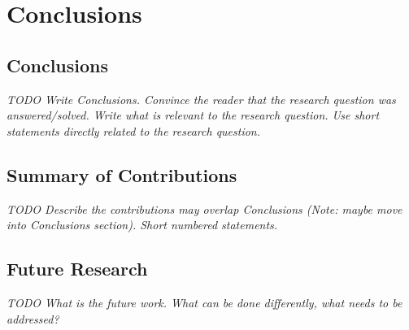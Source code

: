 
\chapter{Conclusions} %
\label{Chapter6}


\section{Conclusions}
\textit{TODO Write Conclusions. Convince the reader that the research question was answered/solved. Write what is relevant to the research question. Use short statements directly related to the research question. }

\lipsum[1-2]

\section{Summary of Contributions}
\textit{TODO Describe the contributions may overlap Conclusions (Note: maybe move into Conclusions section). Short numbered statements.}

\lipsum[1]


\section{Future Research}
\textit{TODO What is the future work. What can be done differently, what needs to be addressed?}

\lipsum[1-2]